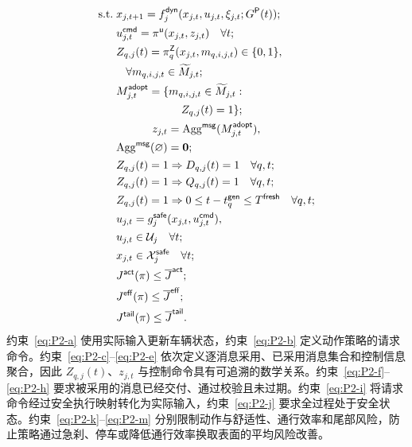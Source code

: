 \documentclass[10pt,a4paper,twocolumn]{article}
\begin{document}
\begin{subequations}
\begin{align}
\mathrm{s.t.}\;&x_{j,t+1}=f_j^{\mathsf{dyn}}(x_{j,t},u_{j,t},\xi_{j,t};
G^{\mathsf P}(t));
\label{eq:P2-a}\\
&u_{j,t}^{\mathsf{cmd}}=\pi^{\mathsf u}(x_{j,t},z_{j,t})
\quad\forall t;
\label{eq:P2-b}\\
&\begin{aligned}
Z_{q,j}(t)&=\pi_{q}^{\mathsf Z}(x_{j,t},m_{q,i,j,t})\in\{0,1\},\\
&\hspace{-2em}\forall m_{q,i,j,t}\in\widetilde M_{j,t};
\end{aligned}
\label{eq:P2-c}\\
&\begin{aligned}
M_{j,t}^{\mathsf{adopt}}=\{m_{q,i,j,t}\in\widetilde M_{j,t}:\\
Z_{q,j}(t)=1\};
\end{aligned}
\label{eq:P2-d}\\
&\begin{aligned}
z_{j,t}&=\operatorname{Agg}^{\mathsf{msg}}(M_{j,t}^{\mathsf{adopt}}),\\
\operatorname{Agg}^{\mathsf{msg}}(\varnothing)&=\mathbf 0;
\end{aligned}
\label{eq:P2-e}\\
&Z_{q,j}(t)=1\Rightarrow D_{q,j}(t)=1\quad\forall q,t;
\label{eq:P2-f}\\
&Z_{q,j}(t)=1\Rightarrow Q_{q,j}(t)=1\quad\forall q,t;
\label{eq:P2-g}\\
&Z_{q,j}(t)=1\Rightarrow
0\leq t-t_q^{\mathsf{gen}}\leq T^{\mathsf{fresh}}\quad\forall q,t;
\label{eq:P2-h}\\
&\begin{aligned}
u_{j,t}&=g_j^{\mathsf{safe}}(x_{j,t},u_{j,t}^{\mathsf{cmd}}),\\
u_{j,t}&\in\mathcal U_j\quad\forall t;
\end{aligned}
\label{eq:P2-i}\\
&x_{j,t}\in\mathcal X_j^{\mathsf{safe}}\quad\forall t;
\label{eq:P2-j}\\
&J^{\mathsf{act}}(\pi)\leq\overline J^{\mathsf{act}};
\label{eq:P2-k}
\\
&J^{\mathsf{eff}}(\pi)\leq\overline J^{\mathsf{eff}};
\label{eq:P2-l}\\
&J^{\mathsf{tail}}(\pi)\leq\overline J^{\mathsf{tail}}.
\label{eq:P2-m}
\end{align}
\end{subequations}
约束~\eqref{eq:P2-a} 使用实际输入更新车辆状态，约束~\eqref{eq:P2-b} 定义动作策略的请求命令。约束~\eqref{eq:P2-c}--\eqref{eq:P2-e} 依次定义逐消息采用、已采用消息集合和控制信息聚合，因此 $Z_{q,j}(t)$、$z_{j,t}$ 与控制命令具有可追溯的数学关系。约束~\eqref{eq:P2-f}--\eqref{eq:P2-h} 要求被采用的消息已经交付、通过校验且未过期。约束~\eqref{eq:P2-i} 将请求命令经过安全执行映射转化为实际输入，约束~\eqref{eq:P2-j} 要求全过程处于安全状态。约束~\eqref{eq:P2-k}--\eqref{eq:P2-m} 分别限制动作与舒适性、通行效率和尾部风险，防止策略通过急刹、停车或降低通行效率换取表面的平均风险改善。
\end{document}
